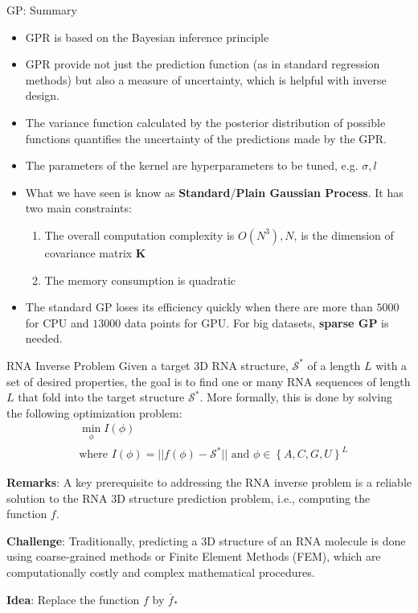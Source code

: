 \documentclass[10pt]{beamer}
\begin{document}
\begin{frame}{GP: Summary}
	\begin{itemize}
		\item GPR is based on the Bayesian inference principle 
		\item GPR provide not just the prediction function (as in standard regression methods) but also a measure of uncertainty, which is helpful with inverse design.
		\item The variance function calculated by the posterior distribution of possible functions quantifies the uncertainty of the predictions made by the GPR.
		\item The parameters of the kernel are hyperparameters to be tuned, e.g. $\sigma, l$
		\item What we have seen is know as \textbf{Standard}/\textbf{Plain Gaussian Process}. It has two main constraints:
		\begin{enumerate}
			\item The overall computation complexity is $O(N^3), N$, is the dimension of covariance matrix $\mathbf{K}$
			\item The memory consumption is quadratic
		\end{enumerate}
		\item The standard GP loses its efficiency quickly when there are more than $5000$ for CPU and $13000$ data points for GPU. For big datasets, \textbf{sparse GP} is needed.
	\end{itemize}
\end{frame}
\begin{frame}[fragile]{RNA Inverse Problem}
	Given a target 3D RNA structure, $\mathcal{S}^*$ of a length $L$ with a set of desired properties, the goal is to find one or many RNA sequences of length $L$ that fold into the target structure $\mathcal{S}^*$. More formally, this is done by solving the following optimization problem: 
	\begin{align*}
		&\min_\phi I(\phi) \\ 
		&\text{where } I(\phi) = || f(\phi) - \mathcal{S}^*|| \text{ and } \phi \in \left \{ A, C, G, U\right\}^L
	\end{align*}
	
	\textbf{Remarks}: A key prerequisite to addressing the RNA inverse problem is a reliable solution to the RNA 3D structure prediction problem, i.e., computing the function $f$. 
	
	\textbf{Challenge}: Traditionally, predicting a 3D structure of an RNA molecule is done using coarse-grained methods or Finite Element Methods (FEM), which are computationally costly and complex mathematical procedures.  
	
	\textbf{Idea}: Replace the function $f$ by $\bar{f}_*$ 
	
\end{frame}
\end{document}
